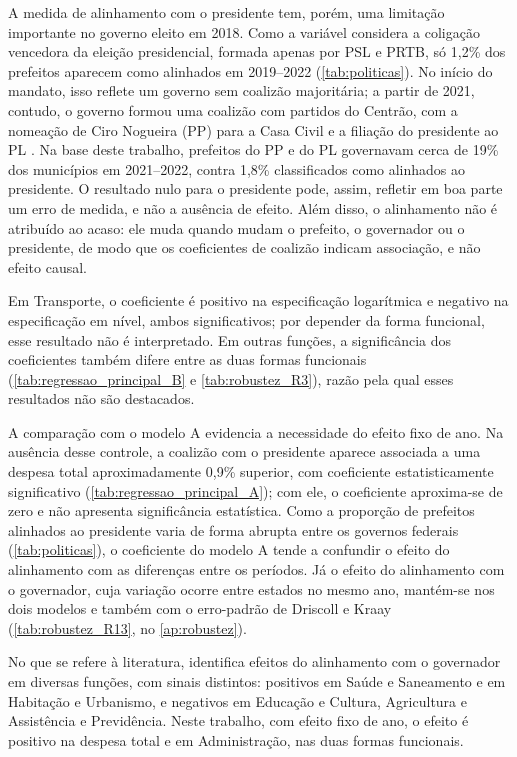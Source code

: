 A medida de alinhamento com o presidente tem, porém, uma limitação importante no governo eleito em 2018. Como a variável considera a coligação vencedora da eleição presidencial, formada apenas por PSL e PRTB, só 1,2\% dos prefeitos aparecem como alinhados em 2019--2022 (\autoref{tab:politicas}). No início do mandato, isso reflete um governo sem coalizão majoritária; a partir de 2021, contudo, o governo formou uma coalizão com partidos do Centrão, com a nomeação de Ciro Nogueira (PP) para a Casa Civil e a filiação do presidente ao PL \parencite{torres2024}. Na base deste trabalho, prefeitos do PP e do PL governavam cerca de 19\% dos municípios em 2021--2022, contra 1,8\% classificados como alinhados ao presidente. O resultado nulo para o presidente pode, assim, refletir em boa parte um erro de medida, e não a ausência de efeito. Além disso, o alinhamento não é atribuído ao acaso: ele muda quando mudam o prefeito, o governador ou o presidente, de modo que os coeficientes de coalizão indicam associação, e não efeito causal.

Em Transporte, o coeficiente é positivo na especificação logarítmica e negativo na especificação em nível, ambos significativos; por depender da forma funcional, esse resultado não é interpretado. Em outras funções, a significância dos coeficientes também difere entre as duas formas funcionais (\autoref{tab:regressao_principal_B} e \autoref{tab:robustez_R3}), razão pela qual esses resultados não são destacados.

A comparação com o modelo A evidencia a necessidade do efeito fixo de ano. Na ausência desse controle, a coalizão com o presidente aparece associada a uma despesa total aproximadamente 0,9\% superior, com coeficiente estatisticamente significativo (\autoref{tab:regressao_principal_A}); com ele, o coeficiente aproxima-se de zero e não apresenta significância estatística. Como a proporção de prefeitos alinhados ao presidente varia de forma abrupta entre os governos federais (\autoref{tab:politicas}), o coeficiente do modelo A tende a confundir o efeito do alinhamento com as diferenças entre os períodos. Já o efeito do alinhamento com o governador, cuja variação ocorre entre estados no mesmo ano, mantém-se nos dois modelos e também com o erro-padrão de Driscoll e Kraay (\autoref{tab:robustez_R13}, no \autoref{ap:robustez}).

No que se refere à literatura, \textcite{sakurai2009} identifica efeitos do alinhamento com o governador em diversas funções, com sinais distintos: positivos em Saúde e Saneamento e em Habitação e Urbanismo, e negativos em Educação e Cultura, Agricultura e Assistência e Previdência. Neste trabalho, com efeito fixo de ano, o efeito é positivo na despesa total e em Administração, nas duas formas funcionais.

